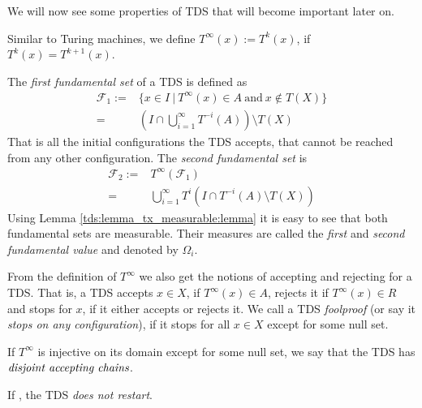 We will now see some properties of TDS that will become important later on.

Similar to Turing machines, we define $T^\infty(x):=T^k(x)$, if $T^k(x)=T^{k+1}(x)$.

The \emph{first fundamental set} of a TDS is defined as
\begin{align*}
	\mathcal{F}_1 :=&\{ x \in I~|~T^\infty(x) \in A~\text{and}~x \notin T(X) \} \\
	=&(I \cap \bigcup_{i=1}^\infty T^{-i}(A)) \setminus T(X)
\end{align*}
That is all the initial configurations the TDS accepts, that cannot be reached from any other configuration.
The \emph{second fundamental set} is
\begin{align*}
	\mathcal{F}_2 :=&T^\infty(\mathcal{F}_1) \\
	=&\bigcup_{i=1}^\infty T^i( I \cap T^{-i}(A) \setminus T(X))
\end{align*}
Using Lemma \ref{tds:lemma_tx_measurable:lemma} it is easy to see that both fundamental sets are measurable.
Their measures are called the \emph{first} and \emph{second fundamental value} and denoted by $\Omega_i$.

From the definition of $T^\infty$ we also get the notions of accepting and rejecting for a TDS.
That is, a TDS accepts $x \in X$, if $T^\infty(x) \in A$,
rejects it if $T^\infty(x) \in R$ 
and stops for $x$, if it either accepts or rejects it.
We call a TDS \emph{foolproof} (or say it \emph{stops on any configuration}), if it stops for all $x \in X$ except for some null set.

If $T^\infty$ is injective on its domain except for some null set, we say that the TDS has $\emph{disjoint accepting chains}$.

If , the TDS \emph{does not restart}.

